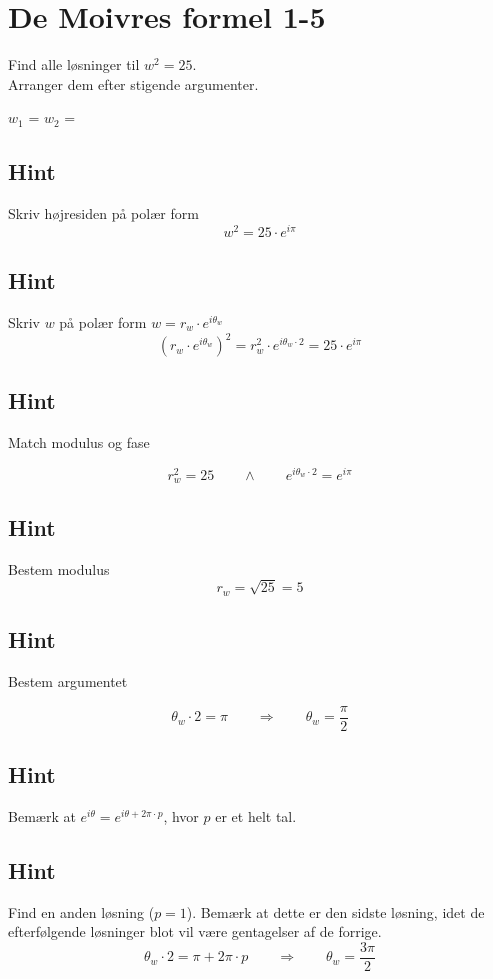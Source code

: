 \documentclass{article}
\newenvironment{exercise}[1]{\newpage\section{#1}}{}
\newcommand{\answerbox}[1]{\fbox{$#1$}}
\newcommand{\hint}{\subsection*{Hint}}
\begin{document}
\begin{exercise}{De Moivres formel 1-5}
	
	Find alle løsninger til $w^2=25$. \\
	Arranger dem efter stigende argumenter.
	
	$w_1$ = \answerbox{5 \cdot e^{i \frac{\pi}{2}}}		$w_2$ = \answerbox{5 \cdot e^{i \frac{3 \pi}{2}}}		
	
	
	\hint 
	
	Skriv højresiden på polær form
	\[
	w^2 = 25 \cdot e^{i \pi}
	\]
	
	
	\hint
	
	Skriv $w$ på polær form $w = r_w \cdot e^{i \theta_w}$
	\[
	\left(r_w \cdot e^{i \theta_w}\right)^2 = r_w^2 \cdot e^{i \theta_w \cdot 2} = 25 \cdot e^{i \pi}
	\]
	
	\hint 
	Match modulus og fase
	
	\[
	r_w^2 = 25 \qquad \wedge \qquad e^{i \theta_w \cdot 2} = e^{i \pi}
	\]
	
	\hint
	
	Bestem modulus
	\[
	r_w  =  \sqrt{25} = 5
	\]
	
	\hint
	
	Bestem argumentet
	
	\[
	\theta_w \cdot 2 = \pi \qquad \Rightarrow \qquad  \theta_w = \frac{\pi}{2}
	\]
	
	\hint
	
	Bemærk at $e^{i \theta} = e^{i \theta + 2 \pi \cdot p}$, hvor $p$ er et helt tal.
	
	\hint
	
	Find en anden løsning ($p=1$). Bemærk at dette er den sidste løsning, idet de efterfølgende løsninger blot vil være gentagelser af de forrige.
	\[
	\theta_w \cdot 2 = \pi  + 2 \pi \cdot p \qquad \Rightarrow \qquad  \theta_w = \frac{3 \pi}{2}
	\]
	

	
\end{exercise}
\end{document}
